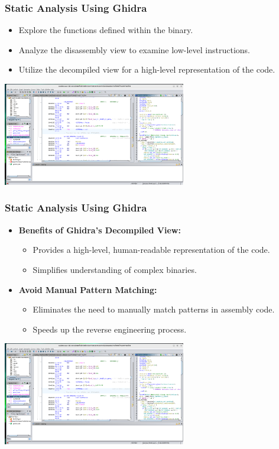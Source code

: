 \begin{frame}
\frametitle{Static Analysis Using Ghidra}

\begin{itemize}
    \item Explore the functions defined within the binary.
    \item Analyze the disassembly view to examine low-level instructions.
    \item Utilize the decompiled view for a high-level representation of the code.
\end{itemize}

\centering
\includegraphics[width=0.6\textwidth]{img/g2.png}
\end{frame}

\begin{frame}
\frametitle{Static Analysis Using Ghidra}

\begin{itemize}
    \item \textbf{Benefits of Ghidra's Decompiled View:}
    \begin{itemize}
        \item Provides a high-level, human-readable representation of the code.
        \item Simplifies understanding of complex binaries.
    \end{itemize}
    \item \textbf{Avoid Manual Pattern Matching:}
    \begin{itemize}
        \item Eliminates the need to manually match patterns in assembly code.
        \item Speeds up the reverse engineering process.
    \end{itemize}
\end{itemize}

\centering
\includegraphics[width=0.6\textwidth]{img/g2.png}
\end{frame}
